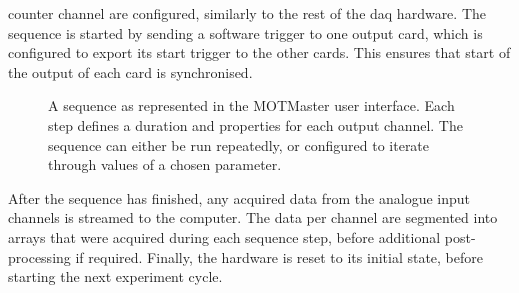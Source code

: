 counter channel are configured, similarly to the rest of the \ac{daq}
hardware. The sequence is started by sending a software trigger to one output
card, which is configured to export its start trigger to the other cards.
This ensures that start of the output of each card is synchronised. 
\begin{figure}[!htbp]
    \centering
    \caption[MOTMaster user interface]{A sequence as represented in the MOTMaster user interface. Each step defines a duration and properties for each output channel. The sequence can either be run repeatedly, or configured to iterate through values of a chosen parameter.}
    \label{fig:motmaster_sequence}
\end{figure}
\par\noindent
After the sequence has finished, any acquired data from the analogue input channels is
streamed to the computer. The data per channel are segmented into arrays that
were acquired during each sequence step, before additional post-processing if
required. Finally, the hardware is reset to its initial state, before
starting the next experiment cycle.

